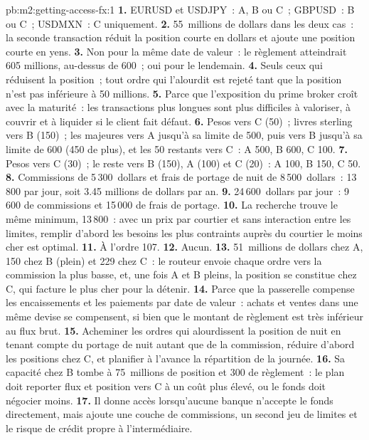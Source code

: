 \begin{solution}{pb:m2:getting-access-fx:1}
\textbf{1.} EURUSD et USDJPY~: A, B ou C~; GBPUSD~: B ou C~; USDMXN~: C uniquement.
\textbf{2.} 55~millions de dollars dans les deux cas~: la seconde transaction réduit la position courte en dollars et ajoute
une position courte en yens.
\textbf{3.} Non pour la même date de valeur~: le règlement atteindrait 605 millions, au-dessus de 600~;
oui pour le lendemain.
\textbf{4.} Seuls ceux qui réduisent la position~; tout ordre qui l'alourdit est rejeté
tant que la position n'est pas inférieure à 50 millions.
\textbf{5.} Parce que l'exposition du prime broker croît avec la maturité~: les transactions plus longues sont
plus difficiles à valoriser, à couvrir et à liquider si le client fait défaut.
\textbf{6.} Pesos vers C (50)~; livres sterling vers B (150)~; les majeures vers A jusqu'à sa limite de 500, puis vers B
jusqu'à sa limite de 600 (450 de plus), et les 50 restants vers C~: A 500, B 600, C 100.
\textbf{7.} Pesos vers C (30)~; le reste vers B (150), A (100) et C (20)~: A 100, B 150, C 50.
\textbf{8.} Commissions de 5\,300~dollars et frais de portage de nuit de 8\,500~dollars~: 13\,800 par jour, soit 3.45
millions de dollars par an.
\textbf{9.} 24\,600~dollars par jour~: 9\,600 de commissions et 15\,000 de frais de portage.
\textbf{10.} La recherche trouve le même minimum, 13\,800~: avec un prix par courtier et
sans interaction entre les limites, remplir d'abord les besoins les plus contraints auprès du
courtier le moins cher est optimal.
\textbf{11.} À l'ordre 107.
\textbf{12.} Aucun.
\textbf{13.} 51~millions de dollars chez A, 150 chez B (plein) et 229 chez C~: le routeur envoie chaque
ordre vers la commission la plus basse, et, une fois A et B pleins, la position se constitue chez C, qui
facture le plus cher pour la détenir.
\textbf{14.} Parce que la passerelle compense les encaissements et les paiements par date de valeur~: achats et ventes
dans une même devise se compensent, si bien que le montant de règlement est très inférieur au flux brut.
\textbf{15.} Acheminer les ordres qui alourdissent la position de nuit en tenant compte du portage de nuit autant que
de la commission, réduire d'abord les positions chez C, et planifier à l'avance la répartition de la journée.
\textbf{16.} Sa capacité chez B tombe à 75~millions de position et 300 de règlement~:
le plan doit reporter flux et position vers C à un coût plus élevé, ou le fonds doit négocier moins.
\textbf{17.} Il donne accès lorsqu'aucune banque n'accepte le fonds directement, mais ajoute une couche
de commissions, un second jeu de limites et le risque de crédit propre à l'intermédiaire.

\end{solution}

